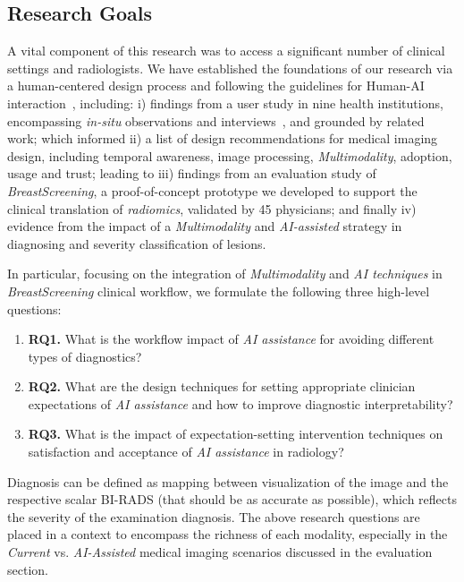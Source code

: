 \subsection{Research Goals}

A vital component of this research was to access a significant number of clinical settings and radiologists.
We have established the foundations of our research via a human-centered design process and following the guidelines for Human-AI interaction~\cite{amershi2019guidelines, Cai:2019:HTC:3290605.3300234, Kocielnik:2019:YAI:3290605.3300641}, including:
i) findings from a user study in nine health institutions, encompassing {\it in-situ} observations and interviews~\cite{Lim:2019:DDI:3319806.3301427, Sarcevic:2012:TET:2240156.2240161}, and grounded by related work; which informed
ii) a list of design recommendations for medical imaging design, including temporal awareness, image processing, {\it Multimodality}, adoption, usage and trust; leading to
iii) findings from an evaluation study of {\it BreastScreening}, a proof-of-concept prototype we developed to support the clinical translation of {\it radiomics}, validated by 45 physicians; and finally
iv) evidence from the impact of a {\it Multimodality} and {\it AI-assisted} strategy in diagnosing and severity classification of lesions.

\hfill

\noindent
In particular, focusing on the integration of {\it Multimodality} and {\it AI techniques} in {\it BreastScreening} clinical workflow, we formulate the following three high-level questions:

\hfill
\begin{enumerate}
\item {\bf RQ1.} What is the workflow impact of {\it AI assistance} for avoiding different types of diagnostics?
\item {\bf RQ2.} What are the design techniques for setting appropriate clinician expectations of {\it AI assistance} and how to improve diagnostic interpretability?
\item {\bf RQ3.} What is the impact of expectation-setting intervention techniques on satisfaction and acceptance of {\it AI assistance} in radiology?
\end{enumerate}
\hfill

Diagnosis can be defined as mapping between visualization of the image and the respective scalar BI-RADS (that should be as accurate as possible), which reflects the severity of the examination diagnosis.
The above research questions are placed in a context to encompass the  richness of each modality, especially in the {\it Current} vs. {\it AI-Assisted} medical imaging scenarios discussed in the evaluation section.